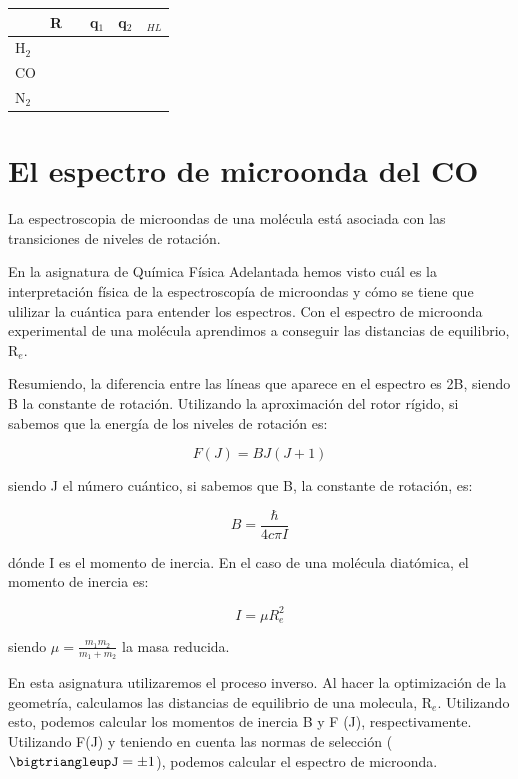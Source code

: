 \documentclass{tufte-book}
\begin{document}
\begin{table}[h!]
\centering
	\scriptsize
	\begin{tabular}{llllll}
	\toprule
	   & R &\mu & q$_1$ &  q$_2$ & \bigtriangleup$_{HL}$ \\
		\hline
		H$_2$ &   &   &   &  &   \\       
		CO    &   &   &   &  &   \\       
		N$_2$ &   &   &   &  &   \\
	\bottomrule	
    \end{tabular}
\end{table}

\section{El espectro de microonda del CO}

La espectroscopia de microondas de una molécula está asociada con las transiciones de niveles de rotación.

En la asignatura de Química Física Adelantada hemos visto cuál es la interpretación física de la espectroscopía de microondas y cómo se tiene que ulilizar la cuántica para entender los espectros. Con el espectro de microonda experimental de una molécula aprendimos a conseguir las distancias de equilibrio, R$_e$.

Resumiendo, la diferencia entre las líneas que aparece en el espectro es 2B, siendo B la constante de rotación. Utilizando la aproximación del rotor rígido, si sabemos que la energía de los niveles de rotación es:

\begin{equation}
    F(J) = BJ(J+1)
\end{equation}

siendo J el número cuántico, si sabemos que  B, la constante de rotación, es:

\begin{equation}
    B = \frac{\hbar}{4c\pi I}
\end{equation}

dónde I es el momento de inercia. En el caso de una molécula diatómica, el momento de inercia es:

\begin{equation}
    I = \mu R_e^2
\end{equation}

siendo $\mu=\frac{m_1m_2}{m_1+m_2}$ la masa reducida.

En esta asignatura utilizaremos el proceso inverso. Al hacer la optimización de la geometría, calculamos las distancias de equilibrio de una molecula, R$_e$. Utilizando esto, podemos calcular los momentos de inercia B y F (J), respectivamente. Utilizando F(J) y teniendo en cuenta las normas de selección ($\bigtriangleupJ=\pm1$), podemos calcular el espectro de microonda.
\end{document}
